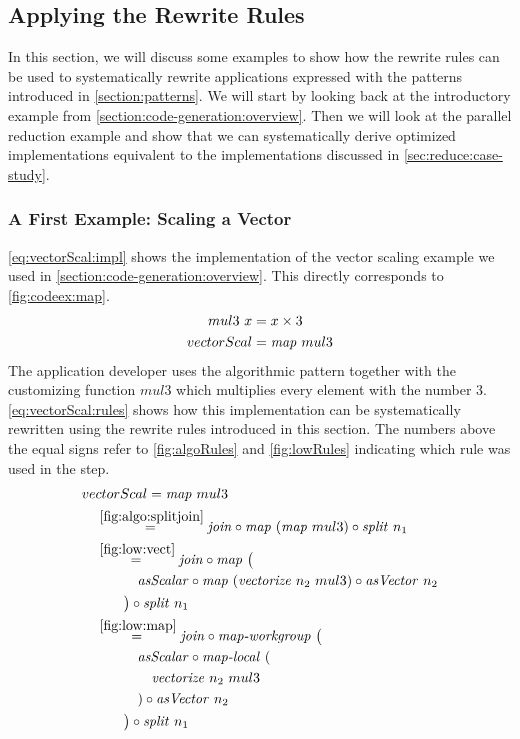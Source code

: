 \subsection{Applying the Rewrite Rules}
\label{sec:example}
In this section, we will discuss some examples to show how the rewrite rules can be used to systematically rewrite applications expressed with the patterns introduced in \autoref{section:patterns}.
We will start by looking back at the introductory example from \autoref{section:code-generation:overview}.
Then we will look at the parallel reduction example and show that we can systematically derive optimized implementations equivalent to the implementations discussed in \autoref{sec:reduce:case-study}.

\subsubsection{A First Example: Scaling a Vector}
\autoref{eq:vectorScal:impl} shows the implementation of the vector scaling example we used in \autoref{section:code-generation:overview}.
This directly corresponds to \autoref{fig:codeex:map}.
\begin{align}
  mul3\ x &= x \times 3\nonumber\\
  vectorScal &= \text{\textit{map}}\ mul3
  \label{eq:vectorScal:impl}
\end{align}
The application developer uses the algorithmic pattern \map together with the customizing function $mul3$ which multiplies every element with the number $3$.
\autoref{eq:vectorScal:rules} shows how this implementation can be systematically rewritten using the rewrite rules introduced in this section.
The numbers above the equal signs refer to \autoref{fig:algoRules} and \autoref{fig:lowRules} indicating which rule was used in the step.
\begin{align}
  &vectorScal = \text{\textit{map}}\ mul3\nonumber\\
  &\quad\begin{aligned}
    &\overset{\ref{fig:algo:splitjoin}}{=\hspace{.2em}}
      \text{\textit{join}} \circ \text{\textit{map}}\ (\text{\textit{map}}\ mul3) \circ \text{\textit{split}}\ n_1\\
    &\overset{\ref{fig:low:vect}}{=\hspace{.2em}}
      \text{\textit{join}} \circ \text{\textit{map}}\ \big(\\
      &\qquad\quad \text{\textit{asScalar}} \circ \text{\textit{map}}\ (\text{\textit{vectorize}}\ n_2\ mul3) \circ \text{\textit{asVector}}\ n_2\\
      &\qquad\big) \circ \text{\textit{split}}\ n_1\\
    &\overset{\ref{fig:low:map}}{=\hspace{.2em}}
      \text{\textit{join}} \circ \text{\textit{map-workgroup}}\ \big(\\
      &\qquad\quad \text{\textit{asScalar}} \circ \text{\textit{map-local}}\ (\\
      &\qquad\qquad\text{\textit{vectorize}}\ n_2\ mul3\\
      &\qquad\quad) \circ \text{\textit{asVector}}\ n_2\\
      &\qquad\big) \circ \text{\textit{split}}\ n_1
  \end{aligned}
  \label{eq:vectorScal:rules}
\end{align}
